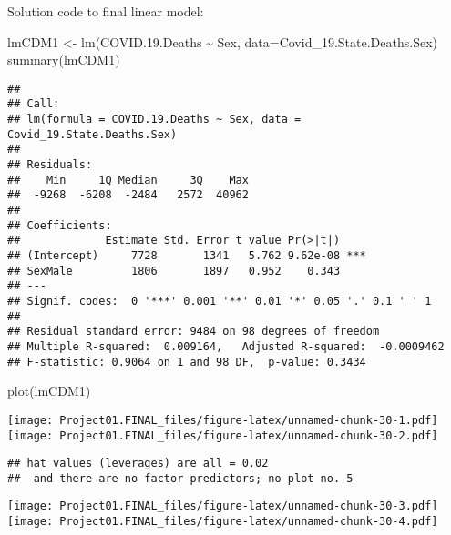 \documentclass[
]{article}
\newenvironment{Shaded}{\begin{snugshade}}{\end{snugshade}}
\newcommand{\AttributeTok}[1]{\textcolor[rgb]{0.77,0.63,0.00}{#1}}
\newcommand{\FloatTok}[1]{\textcolor[rgb]{0.00,0.00,0.81}{#1}}
\newcommand{\FunctionTok}[1]{\textcolor[rgb]{0.00,0.00,0.00}{#1}}
\newcommand{\NormalTok}[1]{#1}
\newcommand{\OtherTok}[1]{\textcolor[rgb]{0.56,0.35,0.01}{#1}}
\newcommand{\SpecialCharTok}[1]{\textcolor[rgb]{0.00,0.00,0.00}{#1}}
\begin{document}
Solution code to final linear model:

\begin{Shaded}
\begin{Highlighting}[]
\NormalTok{lmCDM1 }\OtherTok{\textless{}{-}} \FunctionTok{lm}\NormalTok{(COVID.}\FloatTok{19.}\NormalTok{Deaths }\SpecialCharTok{\textasciitilde{}}\NormalTok{ Sex, }\AttributeTok{data=}\NormalTok{Covid\_19.State.Deaths.Sex)}
\FunctionTok{summary}\NormalTok{(lmCDM1)}
\end{Highlighting}
\end{Shaded}

\begin{verbatim}
## 
## Call:
## lm(formula = COVID.19.Deaths ~ Sex, data = Covid_19.State.Deaths.Sex)
## 
## Residuals:
##    Min     1Q Median     3Q    Max 
##  -9268  -6208  -2484   2572  40962 
## 
## Coefficients:
##             Estimate Std. Error t value Pr(>|t|)    
## (Intercept)     7728       1341   5.762 9.62e-08 ***
## SexMale         1806       1897   0.952    0.343    
## ---
## Signif. codes:  0 '***' 0.001 '**' 0.01 '*' 0.05 '.' 0.1 ' ' 1
## 
## Residual standard error: 9484 on 98 degrees of freedom
## Multiple R-squared:  0.009164,   Adjusted R-squared:  -0.0009462 
## F-statistic: 0.9064 on 1 and 98 DF,  p-value: 0.3434
\end{verbatim}

\begin{Shaded}
\begin{Highlighting}[]
\FunctionTok{plot}\NormalTok{(lmCDM1)}
\end{Highlighting}
\end{Shaded}

\texttt{[image: Project01.FINAL\_files/figure-latex/unnamed-chunk-30-1.pdf]}
\texttt{[image: Project01.FINAL\_files/figure-latex/unnamed-chunk-30-2.pdf]}

\begin{verbatim}
## hat values (leverages) are all = 0.02
##  and there are no factor predictors; no plot no. 5
\end{verbatim}

\texttt{[image: Project01.FINAL\_files/figure-latex/unnamed-chunk-30-3.pdf]}
\texttt{[image: Project01.FINAL\_files/figure-latex/unnamed-chunk-30-4.pdf]}
\end{document}
